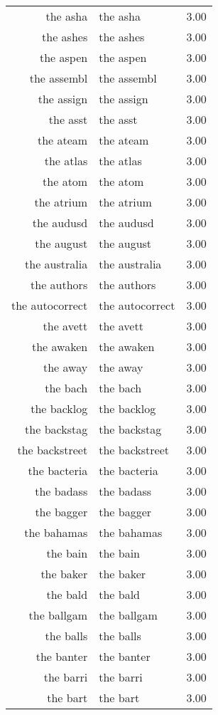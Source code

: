 \begin{table}[ht]
\begin{tabular}{rlr}
  the asha & the asha & 3.00 \\ 
  the ashes & the ashes & 3.00 \\ 
  the aspen & the aspen & 3.00 \\ 
  the assembl & the assembl & 3.00 \\ 
  the assign & the assign & 3.00 \\ 
  the asst & the asst & 3.00 \\ 
  the ateam & the ateam & 3.00 \\ 
  the atlas & the atlas & 3.00 \\ 
  the atom & the atom & 3.00 \\ 
  the atrium & the atrium & 3.00 \\ 
  the audusd & the audusd & 3.00 \\ 
  the august & the august & 3.00 \\ 
  the australia & the australia & 3.00 \\ 
  the authors & the authors & 3.00 \\ 
  the autocorrect & the autocorrect & 3.00 \\ 
  the avett & the avett & 3.00 \\ 
  the awaken & the awaken & 3.00 \\ 
  the away & the away & 3.00 \\ 
  the bach & the bach & 3.00 \\ 
  the backlog & the backlog & 3.00 \\ 
  the backstag & the backstag & 3.00 \\ 
  the backstreet & the backstreet & 3.00 \\ 
  the bacteria & the bacteria & 3.00 \\ 
  the badass & the badass & 3.00 \\ 
  the bagger & the bagger & 3.00 \\ 
  the bahamas & the bahamas & 3.00 \\ 
  the bain & the bain & 3.00 \\ 
  the baker & the baker & 3.00 \\ 
  the bald & the bald & 3.00 \\ 
  the ballgam & the ballgam & 3.00 \\ 
  the balls & the balls & 3.00 \\ 
  the banter & the banter & 3.00 \\ 
  the barri & the barri & 3.00 \\ 
  the bart & the bart & 3.00 \\ 

\end{tabular}
\end{table}
